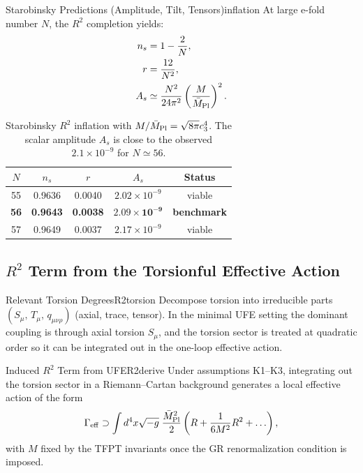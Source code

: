 \begin{theorem}{Starobinsky Predictions (Amplitude, Tilt, Tensors)}{inflation}
At large e-fold number $N$, the $R^2$ completion yields:
\begin{align}
    n_s &= 1 - \frac{2}{N}, \label{eq:ns}\\
    r &= \frac{12}{N^2}, \label{eq:r}\\
    A_s &\simeq \frac{N^2}{24\pi^2}\left(\frac{M}{\bar{M}_{\mathrm{Pl}}}\right)^2. \label{eq:As}
\end{align}
\end{theorem}

\begin{table}[H]
\centering
\begin{tabular}{@{}ccccc@{}}
\toprule
$N$ & $n_s$ & $r$ & $A_s$ & \textbf{Status}\\
\midrule
55 & 0.9636 & 0.0040 & $2.02\times10^{-9}$ & viable\\
\textbf{56} & \textbf{0.9643} & \textbf{0.0038} & $\mathbf{2.09\times10^{-9}}$ & \textbf{benchmark}\\
57 & 0.9649 & 0.0037 & $2.17\times10^{-9}$ & viable\\
\bottomrule
\end{tabular}
\caption{Starobinsky $R^2$ inflation with $M/\bar{M}_{\mathrm{Pl}}=\sqrt{8\pi}c_3^4$. The scalar amplitude $A_s$ is close to the observed $2.1\times10^{-9}$ for $N\simeq 56$.}
\label{tab:inflation}
\end{table}

\subsection{\texorpdfstring{$R^2$ Term from the Torsionful Effective Action}{R2 Term from the Torsionful Effective Action}}
\label{sec:r2derive}

\begin{definition}{Relevant Torsion Degrees}{R2torsion}
Decompose torsion into irreducible parts $(S_\mu,\,T_\mu,\,q_{\mu\nu\rho})$ (axial, trace, tensor).
In the minimal UFE setting the dominant coupling is through axial torsion $S_\mu$, and the
torsion sector is treated at quadratic order so it can be integrated out in the one-loop
effective action.
\end{definition}

\begin{theorem}{Induced $R^2$ Term from UFE}{R2derive}
Under assumptions K1--K3, integrating out the torsion sector in a Riemann--Cartan background
generates a local effective action of the form
\begin{equation}
    \Gamma_{\mathrm{eff}} \supset \int d^4x\sqrt{-g}\;\frac{\bar{M}_{\mathrm{Pl}}^2}{2}
    \left(R + \frac{1}{6M^2}R^2 + \ldots\right),
\end{equation}
with $M$ fixed by the TFPT invariants once the GR renormalization condition is imposed.
\end{theorem}

